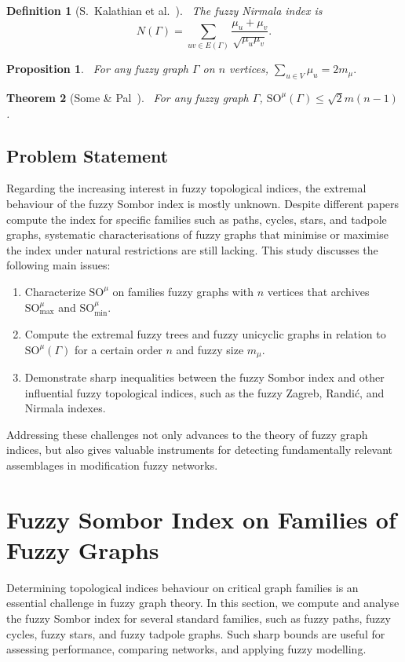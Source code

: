 \documentclass[12pt]{amsart}
\newtheorem{theorem}{Theorem}[section]
\newtheorem{proposition}[theorem]{Proposition}
\newtheorem{definition}{Definition}
\newcommand{\SOG}{\mathrm{SO}^{\mu}}
\begin{document}
\begin{definition}[S.~Kalathian et al.~\cite{Kalathian2020S}]~\label{deffNirmala001}
The fuzzy Nirmala index is
\[
N(\Gamma) = \sum_{uv \in E(\Gamma)} \frac{\mu_u + \mu_v}{\sqrt{\mu_u \mu_v}}.
\]
\end{definition}
\begin{proposition}~\label{proposomb01}
For any fuzzy graph $\Gamma$ on $n$ vertices, $\sum_{u \in V} \mu_u = 2 m_{\mu}.$
\end{proposition}


\begin{theorem}[Some \& Pal~\cite{Some2025Pal}]~\label{Thmper001}
For any fuzzy graph $\Gamma$, $\SOG(\Gamma)\leqslant \sqrt{2}m(n-1)$.  
\end{theorem}

\subsection{Problem Statement}

Regarding the increasing interest in fuzzy topological indices, the extremal behaviour of the fuzzy Sombor index is mostly unknown. 
Despite different papers compute the index for specific families such as paths, cycles, stars, and tadpole graphs, systematic characterisations of fuzzy graphs that minimise or maximise the index under natural restrictions are still lacking. 
This study discusses the following main issues:

\begin{enumerate}
\item Characterize $\SOG$ on families fuzzy graphs with $n$ vertices that archives $\SOG_{\max}$ and $\SOG_{\min}$. 

\item Compute the extremal fuzzy trees and fuzzy unicyclic graphs in relation to $\SOG(\Gamma)$ for a certain order $n$ and fuzzy size $m_{\mu}$.

\item Demonstrate sharp inequalities between the fuzzy Sombor index and other influential fuzzy topological indices, such as the fuzzy Zagreb, Randić, and Nirmala indexes.
\end{enumerate}

Addressing these challenges not only advances to the theory of fuzzy graph indices, but also gives valuable instruments for detecting fundamentally relevant assemblages in modification fuzzy networks.
\section{Fuzzy Sombor Index on Families of Fuzzy Graphs}
Determining topological indices behaviour on critical graph families is an essential challenge in fuzzy graph theory. In this section, we compute and analyse the fuzzy Sombor index for several standard families, such as fuzzy paths, fuzzy cycles, fuzzy stars, and fuzzy tadpole graphs.  Such sharp bounds are useful for assessing performance, comparing networks, and applying fuzzy modelling. 
\end{document}
